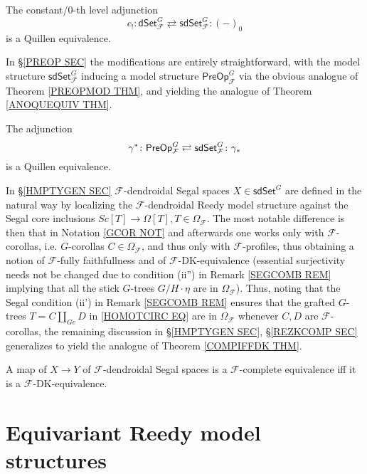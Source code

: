 \documentclass[a4paper,10pt
 ,draft
]{article}%
\begin{document}
\begin{theorem}\label{FINC0AGJ THM}
	The constant/$0$-th level adjunction
	\[
	c_!\colon 
	\mathsf{dSet}^G_{\mathcal{F}} \rightleftarrows \mathsf{sdSet}^G_{\mathcal{F}}
	\colon (-)_0
	\]
	is a Quillen equivalence.
\end{theorem}
In \S \ref{PREOP SEC} the modifications are entirely straightforward, with the model structure 
$\mathsf{sdSet}^G_{\mathcal{F}}$
inducing a model structure
$\mathsf{PreOp}^G_{\mathcal{F}}$ via the obvious analogue of 
Theorem \ref{PREOPMOD THM}, and yielding the analogue of Theorem \ref{ANOQUEQUIV THM}.
\begin{theorem}\label{FANOQUEQUIV THM}
The adjunction
\[
	\gamma^{\**} \colon \mathsf{PreOp}^G_{\mathcal{F}}
\rightleftarrows
	\mathsf{sdSet}^G_{\mathcal{F}} \colon \gamma_{\**}
\]
is a Quillen equivalence.
\end{theorem}
In \S \ref{HMPTYGEN SEC} $\mathcal{F}$-dendroidal Segal spaces
$X \in \mathsf{sdSet}^G$
are defined in the natural way by localizing the $\mathcal{F}$-dendroidal Reedy model structure against the Segal core inclusions
$Sc[T] \to \Omega[T], T \in \Omega_{\mathcal{F}}$.
The most notable difference is then that in Notation \ref{GCOR NOT} and afterwards one works only with 
$\mathcal{F}$-corollas, i.e. $G$-corollas
$C \in \Omega_{\mathcal{F}}$,
and thus only with $\mathcal{F}$-profiles, thus obtaining a notion of $\mathcal{F}$-fully faithfullness and of $\mathcal{F}$-DK-equivalence 
(essential surjectivity needs not be changed due to condition (ii'') in Remark \ref{SEGCOMB REM} implying that all the stick $G$-trees $G/H \cdot \eta$ are in $\Omega_{\mathcal{F}}$).
Thus, noting that the Segal condition 
(ii') in Remark \ref{SEGCOMB REM}
ensures that the grafted $G$-trees 
$T=C \amalg_{Ge} D$ in \eqref{HOMOTCIRC EQ}
are in $\Omega_{\mathcal{F}}$
whenever $C,D$ are $\mathcal{F}$-corollas,
the remaining discussion in 
\S \ref{HMPTYGEN SEC}, \S \ref{REZKCOMP SEC}
generalizes to yield the analogue of 
Theorem \ref{COMPIFFDK THM}.
\begin{theorem}\label{FCOMPIFFDK THM}
A map of $X \to Y$ of $\mathcal{F}$-dendroidal Segal spaces is a $\mathcal{F}$-complete equivalence iff it is a $\mathcal{F}$-DK-equivalence.
\end{theorem}



\appendix

\section{Equivariant Reedy model structures}\label{EQREED AP}
\end{document}
